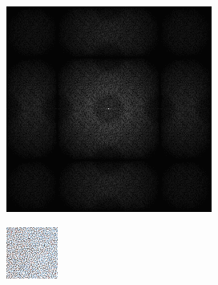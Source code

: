 \begin{figure}[H]
\begin{tcolorbox}[boxrule=4pt,sharp corners=downhill,title=Retargeting]
\begin{subfigure}[b]{0.2\textwidth}
        \includegraphics[width=\textwidth]{content/TemporalerAlg/Bilder/Retargeting/Spektren/Ausschnitt6.png}
        \label{pic:sorting_retarget_t6_FFT}
    \end{subfigure}
    \begin{subfigure}[b]{0.2\textwidth}
        \centering
        \includegraphics[width=\textwidth]{content/TemporalerAlg/Bilder/Retargeting/Ausschnitte/Ausschnitt3.png}

\end{subfigure}
\end{tcolorbox}
\end{figure}
